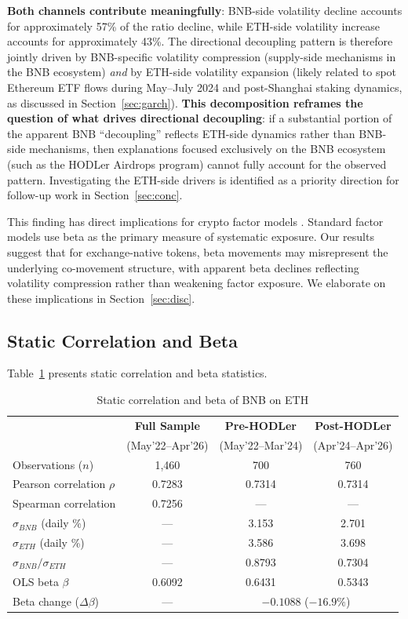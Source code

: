 \documentclass[11pt,a4paper]{article}
\begin{document}
\textbf{Both channels contribute meaningfully}: BNB-side volatility decline accounts for approximately 57\% of the ratio decline, while ETH-side volatility increase accounts for approximately 43\%. The directional decoupling pattern is therefore jointly driven by BNB-specific volatility compression (supply-side mechanisms in the BNB ecosystem) \emph{and} by ETH-side volatility expansion (likely related to spot Ethereum ETF flows during May--July 2024 and post-Shanghai staking dynamics, as discussed in Section~\ref{sec:garch}). \textbf{This decomposition reframes the question of what drives directional decoupling}: if a substantial portion of the apparent BNB ``decoupling'' reflects ETH-side dynamics rather than BNB-side mechanisms, then explanations focused exclusively on the BNB ecosystem (such as the HODLer Airdrops program) cannot fully account for the observed pattern. Investigating the ETH-side drivers is identified as a priority direction for follow-up work in Section~\ref{sec:conc}.

This finding has direct implications for crypto factor models \citep{liu2021,liu2024}. Standard factor models use beta as the primary measure of systematic exposure. Our results suggest that for exchange-native tokens, beta movements may misrepresent the underlying co-movement structure, with apparent beta declines reflecting volatility compression rather than weakening factor exposure. We elaborate on these implications in Section~\ref{sec:disc}.

\subsection{Static Correlation and Beta} \label{sec:static}

Table~\ref{tab:static} presents static correlation and beta statistics.

\begin{table}[H]
\centering
\caption{Static correlation and beta of BNB on ETH}
\label{tab:static}
\begin{tabular}{lccc}
\toprule
& \textbf{Full Sample} & \textbf{Pre-HODLer} & \textbf{Post-HODLer} \\
& (May'22--Apr'26) & (May'22--Mar'24) & (Apr'24--Apr'26) \\
\midrule
Observations ($n$) & 1,460 & 700 & 760 \\
Pearson correlation $\rho$ & 0.7283 & 0.7314 & 0.7314 \\
Spearman correlation & 0.7256 & --- & --- \\
$\sigma_{BNB}$ (daily \%) & --- & 3.153 & 2.701 \\
$\sigma_{ETH}$ (daily \%) & --- & 3.586 & 3.698 \\
$\sigma_{BNB}/\sigma_{ETH}$ & --- & 0.8793 & 0.7304 \\
OLS beta $\beta$ & 0.6092 & 0.6431 & 0.5343 \\
Beta change ($\Delta \beta$) & --- & \multicolumn{2}{c}{$-0.1088$ ($-16.9\%$)} \\
\bottomrule
\end{tabular}
\end{table}
\end{document}
